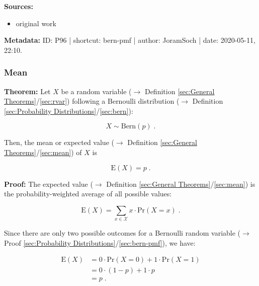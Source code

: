 \documentclass[a4paper,12pt,twoside]{book}
\begin{document}
\vspace{1em}
\textbf{Sources:}
\begin{itemize}
\item original work\end{itemize}


\vspace{1em}
\textbf{Metadata:} ID: P96 | shortcut: bern-pmf | author: JoramSoch | date: 2020-05-11, 22:10.
\vspace{1em}



\subsubsection[\textbf{Mean}]{Mean} \label{sec:bern-mean}
\setcounter{equation}{0}

\textbf{Theorem:} Let $X$ be a random variable ($\rightarrow$ Definition \ref{sec:General Theorems}/\ref{sec:rvar}) following a Bernoulli distribution ($\rightarrow$ Definition \ref{sec:Probability Distributions}/\ref{sec:bern}):

\begin{equation} \label{eq:bern-mean-bern}
X \sim \mathrm{Bern}(p) \; .
\end{equation}

Then, the mean or expected value ($\rightarrow$ Definition \ref{sec:General Theorems}/\ref{sec:mean}) of $X$ is

\begin{equation} \label{eq:bern-mean-bern-mean}
\mathrm{E}(X) = p \; .
\end{equation}


\vspace{1em}
\textbf{Proof:} The expected value ($\rightarrow$ Definition \ref{sec:General Theorems}/\ref{sec:mean}) is the probability-weighted average of all possible values:

\begin{equation} \label{eq:bern-mean-mean}
\mathrm{E}(X) = \sum_{x \in \mathcal{X}} x \cdot \mathrm{Pr}(X = x) \; .
\end{equation}

Since there are only two possible outcomes for a Bernoulli random variable ($\rightarrow$ Proof \ref{sec:Probability Distributions}/\ref{sec:bern-pmf}), we have:

\begin{equation} \label{eq:bern-mean-bern-mean-qed}
\begin{split}
\mathrm{E}(X) &= 0 \cdot \mathrm{Pr}(X = 0) + 1 \cdot \mathrm{Pr}(X = 1) \\
&= 0 \cdot (1-p) + 1 \cdot p \\
&= p \; . \\
\end{split}
\end{equation}
\end{document}
